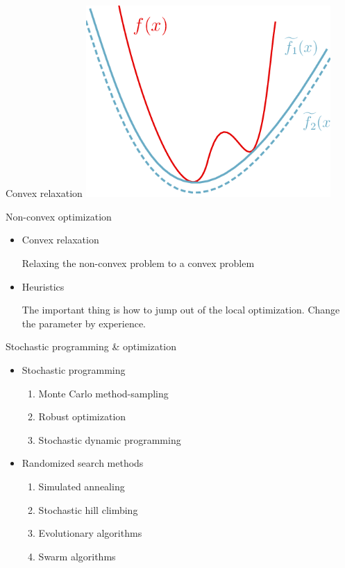     \begin{frame}{Convex relaxation}
      \centering
      \includegraphics[width = 0.7\textwidth]{images/convex-relaxation.png}
    \end{frame}

    \begin{frame}{Non-convex optimization}
      \begin{spacing}{2}
        \begin{itemize}
        \item Convex relaxation

        Relaxing the non-convex problem to a convex problem
        \item Heuristics

        The important thing is how to jump out of the local optimization.
        Change the parameter by experience.
        \end{itemize}
      \end{spacing}
    \end{frame}


    \begin{frame}{Stochastic programming \& optimization}
      \Large
      \begin{spacing}{1.5}
      \begin{itemize}
        \item Stochastic programming
      \begin{enumerate}
        \item Monte Carlo method-sampling
        \item Robust optimization
        \item Stochastic dynamic programming
      \end{enumerate}
      \item Randomized search methods
      \begin{enumerate}
        \item Simulated annealing
        \item Stochastic hill climbing
        \item Evolutionary algorithms
        \item Swarm algorithms
      \end{enumerate}
      \end{itemize}
      \end{spacing}
    \end{frame}
